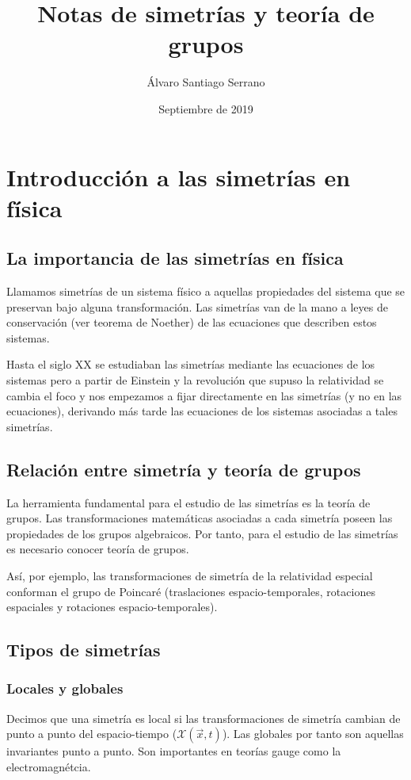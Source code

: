 \documentclass{article}
\title{Notas de simetrías y teoría de grupos}
\author{Álvaro Santiago Serrano }
\date{Septiembre de 2019}
\begin{document}
\maketitle

\section{Introducción a las simetrías en física}
\subsection{La importancia de las simetrías en física}

Llamamos simetrías de un sistema físico a aquellas propiedades del sistema que se preservan bajo alguna transformación. Las simetrías van de la mano a leyes de conservación (ver teorema de Noether) de las ecuaciones que describen estos sistemas.

Hasta el siglo XX se estudiaban las simetrías mediante las ecuaciones de los sistemas pero a partir de Einstein y la revolución que supuso la relatividad se cambia el foco y nos empezamos a fijar directamente en las simetrías (y no en las ecuaciones), derivando más tarde las ecuaciones de los sistemas asociadas a tales simetrías.

\subsection{Relación entre simetría y teoría de grupos}

La herramienta fundamental para el estudio de las simetrías es la teoría de grupos. Las transformaciones matemáticas asociadas a cada simetría poseen las propiedades de los grupos algebraicos. Por tanto, para el estudio de las simetrías es necesario conocer teoría de grupos.

\smallskip
Así, por ejemplo, las transformaciones de simetría de la relatividad especial conforman el grupo de Poincaré (traslaciones espacio-temporales, rotaciones espaciales y rotaciones espacio-temporales).

\subsection{Tipos de simetrías}

\subsubsection{Locales y globales}
Decimos que una simetría es local si las transformaciones de simetría cambian de punto a punto del espacio-tiempo ($\mathcal{X}(\Vec{x},t)$). Las globales por tanto son aquellas invariantes punto a punto. Son importantes en teorías gauge como la electromagnétcia.
\end{document}
